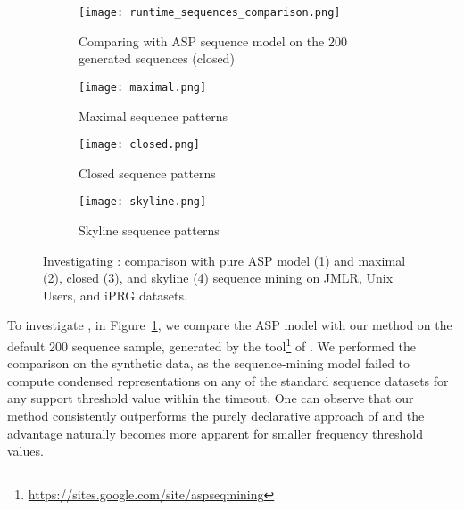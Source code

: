 \begin{figure}[tb]
  \centering
  \begin{subfigure}[t]{0.49\textwidth}
   \texttt{[image: runtime\_sequences\_comparison.png]}
   \caption{Comparing with ASP sequence model \parencite{DBLP:conf/ijcai/GebserGQ0S16} on the 200 generated sequences (closed)}
    \label{fig:sequence_comparison}
  \end{subfigure}
 \hfill
  \begin{subfigure}[t]{0.49\textwidth}
   \texttt{[image: maximal.png]}
   \caption{Maximal sequence patterns} %
    \label{fig:maximal}
  \end{subfigure}
 \hfill
  \begin{subfigure}[t]{0.49\textwidth}
   \texttt{[image: closed.png]}
   \caption{Closed sequence patterns} %
    \label{fig:closed}
  \end{subfigure}
\hfill
  \begin{subfigure}[t]{0.49\textwidth}
   \texttt{[image: skyline.png]}
   \caption{Skyline sequence patterns} %
    \label{fig:skyline}
  \end{subfigure}
  \caption{Investigating \qone: comparison with pure ASP model (\ref{fig:sequence_comparison}) and maximal (\ref{fig:maximal}),  closed (\ref{fig:closed}), and skyline (\ref{fig:skyline}) sequence mining on  JMLR, Unix Users, and iPRG datasets.}
  \label{fig:qone}
\end{figure}

To investigate \qone, in Figure~\ref{fig:sequence_comparison}, we compare the ASP model \parencite{DBLP:conf/ijcai/GebserGQ0S16} with our method on the default 200 sequence sample, generated by the tool\footnote{\url{https://sites.google.com/site/aspseqmining}} of \textcite{DBLP:conf/ijcai/GebserGQ0S16}. We %
performed the comparison on the synthetic data, as the sequence-mining model \parencite{DBLP:conf/ijcai/GebserGQ0S16} failed to compute condensed representations on any of the standard sequence datasets for any support threshold value within the timeout. One can observe that our method consistently outperforms the purely declarative approach of \textcite{DBLP:conf/ijcai/GebserGQ0S16} and the advantage naturally becomes more apparent for smaller frequency threshold values. %
 
